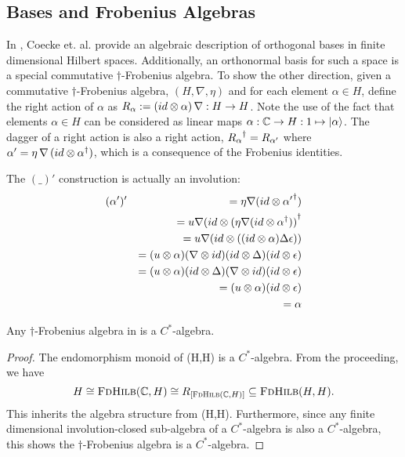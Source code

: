 \subsection{Bases and Frobenius Algebras} %
\label{sub:bases_and_frobenius_algebras}
In \cite{coeckeetal08:ortho}, Coecke et. al. provide an algebraic description of orthogonal bases in
finite dimensional Hilbert spaces. Additionally, an orthonormal basis for such a space is
a special commutative $\dagger$-Frobenius algebra. To show the other direction, given a commutative
$\dagger$-Frobenius algebra, $(H,\nabla,\eta)$ and for each element $\alpha\in H$, define the right
action of $\alpha$ as $R_{\alpha}:=(id\otimes\alpha)\, \nabla:H\to H$. Note the use of the fact that
elements $\alpha\in H$ can be considered as linear maps $\alpha:\mathbb{C} \to H:1\mapsto \left\vert{\alpha}\right\rangle$.
The dagger of a right action is also a right action, ${R_{\alpha}}^{\dagger} = R_{\alpha'}$ where
$\alpha'= \eta\, \nabla\, (id\otimes {\alpha}^{\dagger})$, which is a consequence of the Frobenius identities.

The $(\_)'$ construction is actually an involution:
\begin{eqnarray*}
  &(\alpha')' &= \eta \nabla (id \otimes {\alpha'}^{\dagger}) \\
  && = u \nabla (id \otimes {(\eta \nabla (id \otimes \ensuremath{{\alpha}^{\dagger}}))}^{\dagger}\\
  && = u \nabla (id \otimes ( (id \otimes \alpha) \Delta \epsilon))\\
  && = (u \otimes \alpha) (\nabla \otimes id) (id \otimes \Delta) (id \otimes  \epsilon)\\
  && = (u \otimes \alpha) (id \otimes \Delta) (\nabla \otimes id) (id \otimes  \epsilon)\\
  && = (u \otimes \alpha)  (id \otimes  \epsilon)\\
  && = \alpha
\end{eqnarray*}

\begin{lemma}\label{lemma:cstaralgebra}
  Any $\dagger$-Frobenius algebra in \fdh is a $C^{*}$-algebra.
\end{lemma}
\begin{proof}
  The endomorphism monoid of \fdh(H,H) is a $C^{*}$-algebra. From the proceeding, we have
  \[
    H \cong \textsc{FdHilb}(\mathbb{C},H) \cong R_{[\textsc{FdHilb}(\mathbb{C},H)]}\subseteq\textsc{FdHilb}(H,H).
  \]
  This inherits the algebra structure from \fdh(H,H). Furthermore, since any finite dimensional
  involution-closed sub-algebra of a $C^{*}$-algebra is also a $C^{*}$-algebra, this shows the
  $\dagger$-Frobenius algebra is a $C^{*}$-algebra.
\end{proof}

